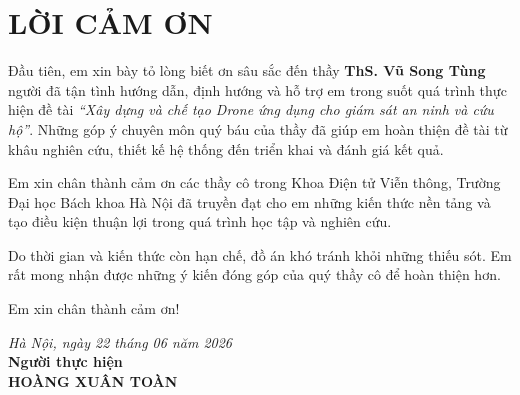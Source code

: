 \section*{LỜI CẢM ƠN}
\thispagestyle{empty}

Đầu tiên, em xin bày tỏ lòng biết ơn sâu sắc đến thầy \textbf{ThS. Vũ Song Tùng} người đã tận tình hướng dẫn, định hướng và hỗ trợ em trong suốt quá trình thực hiện đề tài \textit{``Xây dựng và chế tạo Drone ứng dụng cho giám sát an ninh và cứu hộ''}. Những góp ý chuyên môn quý báu của thầy đã giúp em hoàn thiện đề tài từ khâu nghiên cứu, thiết kế hệ thống đến triển khai và đánh giá kết quả.

Em xin chân thành cảm ơn các thầy cô trong Khoa Điện tử Viễn thông, Trường Đại học Bách khoa Hà Nội đã truyền đạt cho em những kiến thức nền tảng và tạo điều kiện thuận lợi trong quá trình học tập và nghiên cứu.

Do thời gian và kiến thức còn hạn chế, đồ án khó tránh khỏi những thiếu sót. Em rất mong nhận được những ý kiến đóng góp của quý thầy cô để hoàn thiện hơn.

Em xin chân thành cảm ơn!

\vspace{0.5cm}
\hfill
\begin{minipage}{0.5\textwidth}
    \centering
    \textit{Hà Nội, ngày 22 tháng 06 năm 2026} \\
    \vspace{0.2cm}
    \textbf{Người thực hiện} \\
    \vspace{2cm}
    \textbf{HOÀNG XUÂN TOÀN}
\end{minipage}
\cleardoublepage
